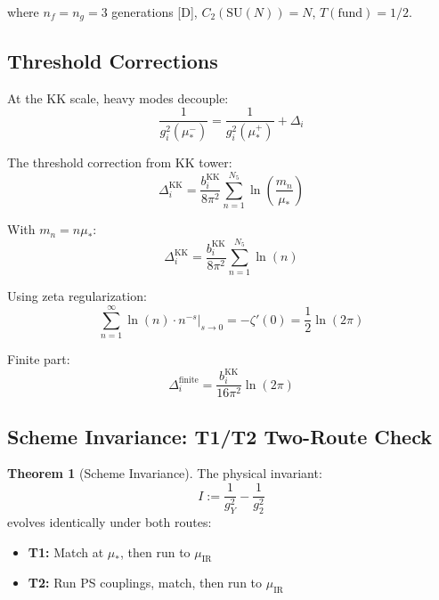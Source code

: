 \documentclass[11pt,a4paper]{article}
\theoremstyle{definition}
\newtheorem{theorem}{Theorem}[section]
\begin{document}
where $n_f = n_g = 3$ generations [D], $C_2(\text{SU}(N)) = N$, $T(\text{fund}) = 1/2$.

\subsection{Threshold Corrections}
\label{subsec:thresholds}

At the KK scale, heavy modes decouple:
\begin{equation}
\label{eq:threshold_def}
\frac{1}{g_i^2(\mu_*^-)} = \frac{1}{g_i^2(\mu_*^+)} + \Delta_i
\end{equation}

The threshold correction from KK tower:
\begin{equation}
\label{eq:Delta_kk}
\Delta_i^{\text{KK}} = \frac{b_i^{\text{KK}}}{8\pi^2}\sum_{n=1}^{N_5}\ln\left(\frac{m_n}{\mu_*}\right)
\end{equation}

With $m_n = n\mu_*$:
\begin{equation}
\label{eq:Delta_kk_2}
\Delta_i^{\text{KK}} = \frac{b_i^{\text{KK}}}{8\pi^2}\sum_{n=1}^{N_5}\ln(n)
\end{equation}

Using zeta regularization:
\begin{equation}
\label{eq:Delta_zeta}
\sum_{n=1}^{\infty}\ln(n) \cdot n^{-s}\Big|_{s\to 0} = -\zeta'(0) = \frac{1}{2}\ln(2\pi)
\end{equation}

Finite part:
\begin{equation}
\label{eq:Delta_finite}
\Delta_i^{\text{finite}} = \frac{b_i^{\text{KK}}}{16\pi^2}\ln(2\pi)
\end{equation}

\subsection{Scheme Invariance: T1/T2 Two-Route Check}
\label{subsec:scheme_invariance}

\begin{theorem}[Scheme Invariance]
\label{thm:scheme}
The physical invariant:
\begin{equation}
\label{eq:invariant_I}
I := \frac{1}{g_Y^2} - \frac{1}{g_2^2}
\end{equation}
evolves identically under both routes:
\begin{itemize}
\item \textbf{T1:} Match at $\mu_*$, then run to $\mu_{\text{IR}}$
\item \textbf{T2:} Run PS couplings, match, then run to $\mu_{\text{IR}}$
\end{itemize}
\end{theorem}
\end{document}
